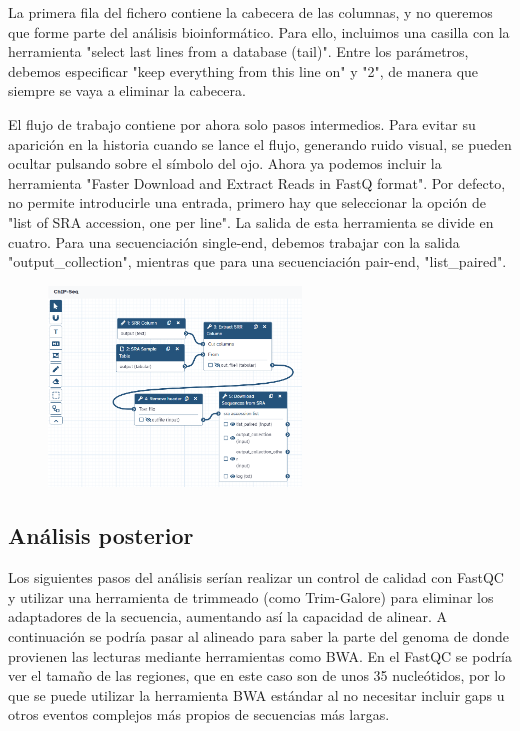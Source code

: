 La primera fila del fichero contiene la cabecera de las columnas, y no queremos que forme parte del análisis bioinformático. Para ello, incluimos una casilla con la herramienta "select last lines from a database (tail)". Entre los parámetros, debemos especificar "keep everything from this line on" y "2", de manera que siempre se vaya a eliminar la cabecera.

El flujo de trabajo contiene por ahora solo pasos intermedios. Para evitar su aparición en la historia cuando se lance el flujo, generando ruido visual, se pueden ocultar pulsando sobre el símbolo del ojo. Ahora ya podemos incluir la herramienta "Faster Download and Extract Reads in FastQ format". Por defecto, no permite introducirle una entrada, primero hay que seleccionar la opción de "list of SRA accession, one per line". La salida de esta herramienta se divide en cuatro. Para una secuenciación single-end, debemos trabajar con la salida "output\_collection", mientras que para una secuenciación pair-end, "list\_paired".

\begin{figure}[h]
\centering
\includegraphics[width = 0.6\textwidth]{figs/chipseq-workflow-start.png}
\end{figure}

\subsection{Análisis posterior}
Los siguientes pasos del análisis serían realizar un control de calidad con FastQC y utilizar una herramienta de trimmeado (como Trim-Galore) para eliminar los adaptadores de la secuencia, aumentando así la capacidad de alinear. A continuación se podría pasar al alineado para saber la parte del genoma de donde provienen las lecturas mediante herramientas como BWA. En el FastQC se podría ver el tamaño de las regiones, que en este caso son de unos 35 nucleótidos, por lo que se puede utilizar la herramienta BWA estándar al no necesitar incluir gaps u otros eventos complejos más propios de secuencias más largas.

